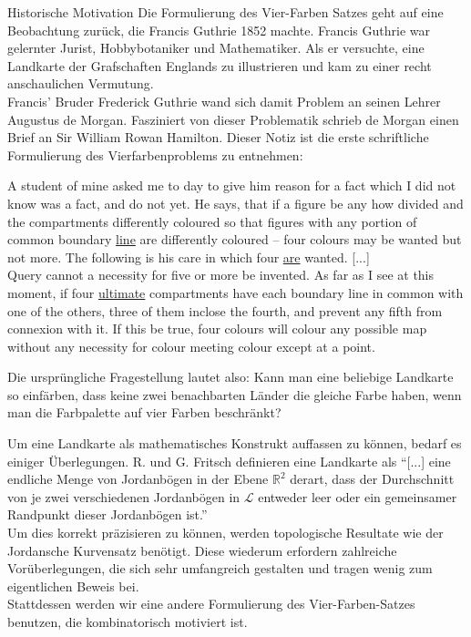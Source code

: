 \begin{section}{Historische Motivation}
 Die Formulierung des Vier-Farben Satzes geht auf eine Beobachtung zurück, die Francis Guthrie 1852 machte. Francis Guthrie war gelernter Jurist, Hobbybotaniker und Mathematiker. Als er versuchte, eine Landkarte der Grafschaften Englands zu illustrieren und kam zu einer recht anschaulichen Vermutung. \\
 Francis' Bruder Frederick Guthrie wand sich damit Problem an seinen Lehrer Augustus de Morgan. Fasziniert von dieser Problematik schrieb de Morgan einen Brief an Sir William Rowan Hamilton. Dieser Notiz ist die erste schriftliche Formulierung des Vierfarbenproblems zu entnehmen:
 
 \begin{satz}
  A student of mine asked me to day to give him reason for a fact which I did not know was a fact, and do not yet. He says, that if a figure be any how divided and the compartments differently coloured so that figures with any portion of common boundary \underline{line} are differently coloured -- four colours may be wanted but not more. The following is his care in which four \underline{are} wanted. [...]\\
  Query cannot a necessity for five or more be invented. As far as I see at this moment, if four \underline{ultimate} compartments have each boundary line in common with one of the others, three of them inclose the fourth, and prevent any fifth from connexion with it. If this be true, four colours will colour any possible map without any necessity for colour meeting colour except at a point.  \cite{fritsch}
 \end{satz}
 
 Die ursprüngliche Fragestellung lautet also: Kann man eine beliebige Landkarte so einfärben, dass keine zwei benachbarten Länder die gleiche Farbe haben, wenn man die Farbpalette auf vier Farben beschränkt?
 
 Um eine Landkarte als mathematisches Konstrukt auffassen zu können, bedarf es einiger Überlegungen. R. und G. Fritsch definieren eine Landkarte als ``[...] eine endliche Menge von Jordanbögen in der Ebene $\mathbb{R}^2$ derart, dass der Durchschnitt von je zwei verschiedenen Jordanbögen in $\mathcal{L}$ entweder leer oder ein gemeinsamer Randpunkt dieser Jordanbögen ist.'' \cite{fritsch}\\
 Um dies korrekt präzisieren zu können, werden topologische Resultate wie der Jordansche Kurvensatz benötigt. Diese wiederum erfordern zahlreiche Vorüberlegungen, die sich sehr umfangreich gestalten und tragen wenig zum eigentlichen Beweis bei. \\
 Stattdessen werden wir eine andere Formulierung des Vier-Farben-Satzes benutzen, die kombinatorisch motiviert ist. 
\end{section}
